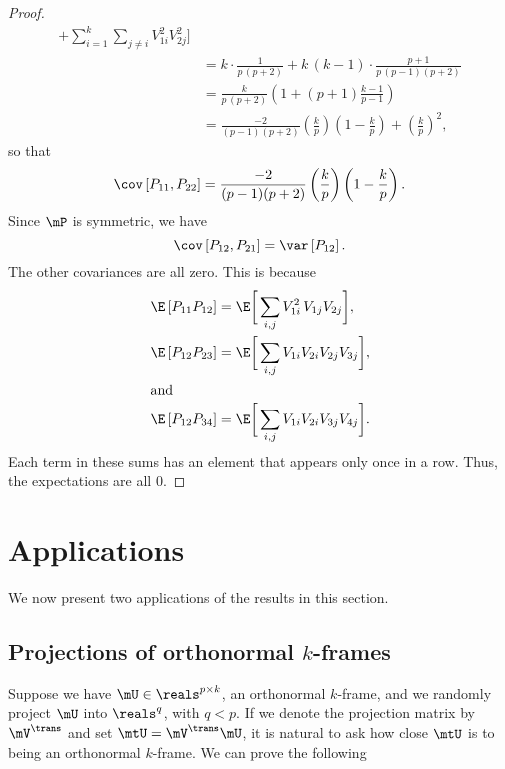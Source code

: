 \begin{proof}
\begin{align*}
                  + \sum_{i=1}^k
                    \sum_{j\neq i} V_{1i}^2 V_{2j}^2
              \bigg] \\
        &= k \cdot \frac{1}{ p \, (p+2) }
           + k \, (k-1) \cdot \frac{ p+1 }{ p \, (p-1) (p+2) } \\
        &= \frac{k}{ p \, (p+2) }
           \left( 1 + (p+1) \frac{k-1}{p-1} \right) \\
        &= \frac{-2}{(p-1)(p+2)}
           \left(\frac{k}{p}\right) \left( 1 - \frac{k}{p} \right)
           + \left( \frac{k}{p} \right)^2,
    \end{align*}
    so that
    \[
        \cov \left[ P_{11}, P_{22} \right]
        = \frac{-2}{ (p-1) (p+2) }
           \left(\frac{k}{p}\right) \left( 1 - \frac{k}{p} \right).
    \]
    Since $\mP$ is symmetric, we have
    \[
        \cov \left[ P_{12}, P_{21} \right]
        = \var \left[ P_{12} \right].
    \]
    The other covariances are all zero.  This is because
    \begin{align*}
        \E \left[ P_{11} P_{12} \right]
        &= \E \bigg[ 
                  \sum_{i,j} V_{1i}^2 \, V_{1j}  V_{2j} 
              \bigg], \\
        \E \left[ P_{12} P_{23} \right]
        &= \E \bigg[ 
                \sum_{i,j} V_{1i} V_{2i} V_{2j} V_{3j}
              \bigg], \\
    \intertext{and}
        \E \left[ P_{12} P_{34} \right]
        &= \E \bigg[ 
                \sum_{i,j} V_{1i} V_{2i} V_{3j} V_{4j}
              \bigg].
    \end{align*}
    Each term in these sums has an element that appears only once in a row.
    Thus, the expectations are all $0$.
\end{proof}


\section{Applications}

We now present two applications of the results in this section.

\subsection{Projections of orthonormal $k$-frames}

Suppose we have $\mU \in \reals^{p \times k}$, an orthonormal $k$-frame,
and we randomly project $\mU$ into $\reals^q$, with $q < p$.  If we denote
the projection matrix by $\mV^\trans$ and set $\mtU =\mV^\trans \mU$, it is 
natural to ask how close $\mtU$ is to being an orthonormal $k$-frame.
We can prove the following

